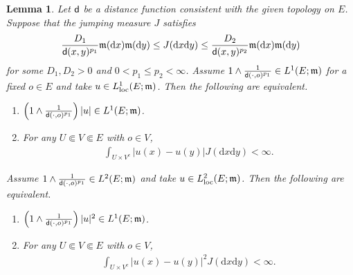 \documentclass[12pt,a4paper]{article}
\newtheorem{lem}[thm]{Lemma}
\renewcommand{\d}{\mathrm{d}}
\newcommand{\m}{\mathfrak{m} }
\newcommand{\loc}{{\rm loc}}
\newcommand{\1}{{\bf 1}}
\begin{document}
\begin{lem}\label{lem:intgrabilityequivalence1}
Let 
${\sf d}$ be a distance function consistent with the given topology on 
 $E$.
Suppose that the jumping measure $J$ satisfies 
$$
\frac{D_1}{{\sf d}(x,y)^{p_1}}{\m}({\d} x)\m({\d} y)\leq
J({\d} x{\d} y)\leq \frac{D_2}{{\sf d}(x,y)^{p_2}}{\m}({\d} x){\m}({\d} y)
$$ 
for some $D_1,D_2>0$ and $0<p_1\leq p_2<\infty$. 
Assume $1\land\frac{1}{{\sf d}(\cdot,o)^{p_1}}\in L^1(E;{\m})$ 
for a fixed $o\in E$ and take $u\in L^1_{\loc}(E;{\m})$. Then the following are equivalent. 
\begin{enumerate}
\item[\rm(1)] $\left(1\land \frac{1}{{\sf d}(\cdot,o)^{p_1}} \right)|u|\in L^1(E;{\m})$.
\item[\rm(2)] For any $U\Subset V\Subset E$ with $o\in V$, 
\begin{align}
\int_{U\times V^c}|u(x)-u(y)|J({\d} x{\d} y)\label{eq:1finite}
<\infty.
\end{align} 
\end{enumerate}
Assume $1\land\frac{1}{{\sf d}(\cdot,o)^{p_1}}\in L^2(E;{\m})$ and 
take $u\in L^2_{\loc}(E;{\m})$. Then the following are equivalent. 
\begin{enumerate}
\item[\rm(3)] $\left(1\land \frac{1}{{\sf d}(\cdot,o)^{p_1}} \right)|u|^2\in L^1(E;{\m})$.
\item[\rm(4)] For any $U\Subset V\Subset E$ with $o\in V$, 
\begin{align}
\int_{U\times V^c}|u(x)-u(y)|^2J({\d} x{\d} y)\label{eq:2finite}
<\infty.
\end{align} 
\end{enumerate}
\end{lem}
\end{document}
